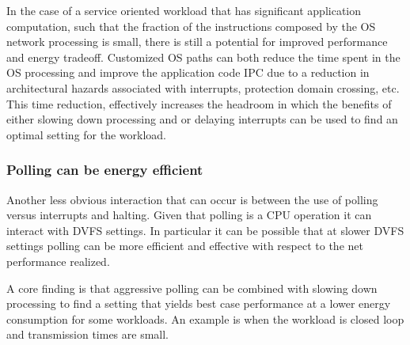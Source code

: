 In the case of a service oriented workload that has significant application computation, such that the fraction of the instructions composed by the OS network processing is small, there is still a potential for improved performance and energy tradeoff.  Customized OS paths can both reduce the time spent in the OS processing and improve the application code IPC due to a reduction in architectural hazards associated with interrupts, protection domain crossing, etc.  This time reduction, effectively increases the headroom in which the benefits of either slowing down processing and or delaying interrupts can be used to find an optimal setting for the workload. 
 
 \subsubsection{Polling can be energy efficient}
 Another less obvious interaction that can occur is between the use of polling versus interrupts and halting.  Given that polling is a CPU operation it can interact with DVFS settings.  In particular it can be possible that at slower DVFS settings polling can be more efficient and effective with respect to the net performance realized.  

A core finding is that aggressive polling can be combined with slowing down processing to find a setting that yields best case performance at a lower energy consumption for some workloads.   An example is when the workload is closed loop and transmission times are small. 



